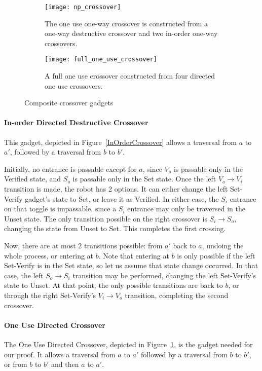 \begin{figure}[!ht]
  \centering
  \begin{subfigure}[b]{0.45\textwidth}
    \texttt{[image: np\_crossover]}
    \caption{The one use one-way crossover is constructed from a one-way destructive crossover and two in-order one-way crossovers.}
    \label{OneUseCrossover}
  \end{subfigure}
  \begin{subfigure}[b]{0.45\textwidth}
    \texttt{[image: full\_one\_use\_crossover]}
    \caption{A full one use crossover constructed from four directed one use crossovers.}
    \label{full_one_use_crossover}
  \end{subfigure}
  \caption{Composite crossover gadgets}
\end{figure}

\paragraph{In-order Directed Destructive Crossover} This gadget, depicted in Figure~\ref{InOrderCrossover} allows a traversal from $a$ to $a'$, followed by a traversal from $b$ to $b'$.

Initially, no entrance is passable except for $a$, since $V_o$ is passable only in the Verified state, and $S_o$ is
passable only in the Set state. Once the left $V_o \rightarrow V_i$ transition is made, the robot has 2 options.
It can either change the left Set-Verify gadget's state to Set, or leave it as Verified. In either case, the $S_i$
entrance on that toggle is impassable, since a $S_i$ entrance may only be traversed in the Unset state. The
only transition possible on the right crossover is $S_i \rightarrow S_o$, changing the state from Unset to Set.
This completes the first crossing.

Now, there are at most 2 transitions possible: from $a'$ back to $a$, undoing the whole process, or entering at $b$. Note that entering at $b$ is only possible if the left Set-Verify is in the Set state, so let us assume that state change occurred. In that case, the left $S_o \rightarrow S_i$ transition may be performed, changing the left Set-Verify's state to Unset. At that point, the only possible transitions are back to $b$, or through the right Set-Verify's
$V_i \rightarrow V_o$ transition, completing the second crossover.


\paragraph{One Use Directed Crossover} 
The One Use Directed Crossover, depicted in Figure~\ref{OneUseCrossover}, is the gadget needed for our proof. It allows a traversal from $a$ to $a'$ followed by a traversal from $b$ to $b'$, or from $b$ to $b'$ and then $a$ to $a'$.

